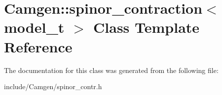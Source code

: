 \hypertarget{a00515}{}\section{Camgen\+:\+:spinor\+\_\+contraction$<$ model\+\_\+t $>$ Class Template Reference}
\label{a00515}


The documentation for this class was generated from the following file\+:\begin{DoxyCompactItemize}
\item 
include/\+Camgen/spinor\+\_\+contr.\+h\end{DoxyCompactItemize}
